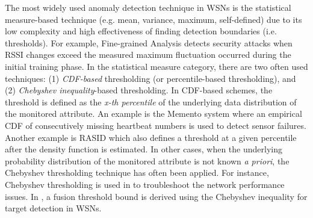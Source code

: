 The most widely used anomaly detection technique in WSNs is the statistical measure-based technique (e.g. mean, variance, maximum, self-defined) due to its low complexity and high effectiveness of finding detection boundaries (i.e. thresholds). For example, Fine-grained Analysis \cite{2517408} detects security attacks when RSSI changes exceed the measured maximum fluctuation occurred during the initial training phase. In the statistical measure category, there are two often used techniques: (1) \textit{CDF-based} thresholding (or percentile-based thresholding), and (2) \textit{Chebyshev inequality}-based thresholding. In CDF-based schemes, the threshold is defined as the \textit{x-th percentile} of the underlying data distribution of the monitored attribute. An example is the Memento system \cite{4068315} where an empirical CDF of consecutively missing heartbeat numbers is used to detect sensor failures. Another example is RASID \cite{6199865} which also defines a threshold at a given percentile after the density function is estimated. In other cases, when the underlying probability distribution of the monitored attribute is not known \textit{a priori}, the Chebyshev thresholding technique has often been applied. For instance, Chebyshev thresholding is used in \cite{1592596} to troubleshoot the network performance issues. 
In \cite{1689248}, a fusion threshold bound is derived using the Chebyshev inequality for target detection in WSNs. %

